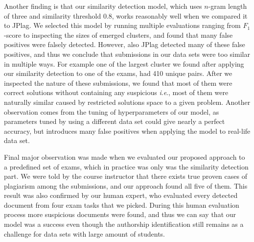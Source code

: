 \documentclass[english, grading]{tktltiki2}
\newcommand{\ie}{\textit{i}.\textit{e}., }
\theoremstyle{definition}
\theoremstyle{remark}
\numberwithin{equation}{section} %
\begin{document}
Another finding is that our similarity detection model, which uses $n$-gram length of three and similarity threshold 0.8, works reasonably well when we compared it to JPlag. We selected this model by running multiple evaluations ranging from $F_1$-score to inspecting the sizes of emerged clusters, and found that many false positives were falsely detected. However, also JPlag detected many of these false positives, and thus we conclude that submissions in our data sets were too similar in multiple ways. For example one of the largest cluster we found after applying our similarity detection to one of the exams, had 410 unique pairs. After we inspected the nature of these submissions, we found that most of them were correct solutions without containing any suspicious \ie most of them were naturally similar caused by restricted solutions space to a given problem. Another observation comes from the tuning of hyperparameters of our model, as parameters tuned by using a different data set could give nearly a perfect accuracy, but introduces many false positives when applying the model to real-life data set. 

Final major observation was made when we evaluated our proposed approach to a predefined set of exams, which in practice was only was the similarity detection part. We were told by the course instructor that there exists true proven cases of plagiarism among the submissions, and our approach found all five of them. This result was also confirmed by our human expert, who evaluated every detected document from four exam tasks that we picked. During this human evaluation process more suspicious documents were found, and thus we can say that our model was a success even though the authorship identification still remains as a challenge for data sets with large amount of students.  

































%

%
%
%
%
\newpage






\newpage
\appendix
% 


\end{document}
